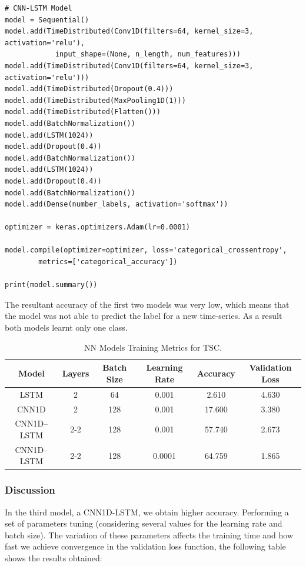 \lstset{language=Python}
\lstset{frame=lines}
\lstset{basicstyle=\footnotesize}
\begin{lstlisting}
# CNN-LSTM Model
model = Sequential()
model.add(TimeDistributed(Conv1D(filters=64, kernel_size=3, activation='relu'), 
			input_shape=(None, n_length, num_features)))
model.add(TimeDistributed(Conv1D(filters=64, kernel_size=3, activation='relu')))
model.add(TimeDistributed(Dropout(0.4)))
model.add(TimeDistributed(MaxPooling1D(1)))
model.add(TimeDistributed(Flatten()))
model.add(BatchNormalization())
model.add(LSTM(1024))
model.add(Dropout(0.4))
model.add(BatchNormalization())
model.add(LSTM(1024))
model.add(Dropout(0.4))
model.add(BatchNormalization())
model.add(Dense(number_labels, activation='softmax'))

optimizer = keras.optimizers.Adam(lr=0.0001)

model.compile(optimizer=optimizer, loss='categorical_crossentropy', 
		metrics=['categorical_accuracy'])

print(model.summary())
\end{lstlisting}

The resultant accuracy of the first two models was very low, which means that the model was not able to predict the label for a new time-series. As a result both models learnt only one class.

\begin{table}[h]
	\centering
	\tiny
	\begin{tabular}{|c|c|c|c|c|c|}
		\hline
		Model        & Layers & Batch Size & Learning Rate & Accuracy & Validation Loss \\ \hline
		LSTM         & 2      &  64        & 0.001         &  2.610   & 4.630           \\
		CNN1D        & 2      & 128        & 0.001         & 17.600   & 3.380           \\
		CNN1D--LSTM  & 2-2    & 128        & 0.001         & 57.740   & 2.673           \\ 		
		CNN1D--LSTM  & 2-2    & 128        & 0.0001		   & 64.759   & 1.865           \\ \hline		
	\end{tabular}
\caption{NN Models Training Metrics for TSC.}
\label{Table:DLModels}
\end{table}

\subsubsection{Discussion}
In the third model, a CNN1D-LSTM, we obtain higher accuracy. Performing a set of parameters tuning (considering several values for the learning rate and batch size). The variation of these parameters affects the training time and how fast we achieve convergence in the validation loss function, the following table shows the results obtained:

